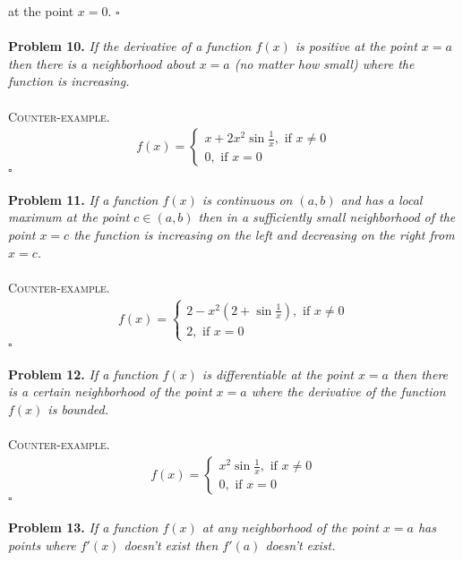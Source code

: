 \documentclass[a4paper]{article}
\numberwithin{equation}{section}
\begin{document}
at the point $x=0$. \hfill $\square$\\
\\
\textbf{Problem 10.} \textit{If the derivative of a function $ f(x)$ is positive at the point $x=a$ then there is a neighborhood about $x=a$ (no matter how small) where the function is increasing.}\\
\\
\textsc{Counter-example.} 
\begin{align}
f\left( x \right) = \left\{ {\begin{array}{*{20}{c}}
{x+2{x^2}\sin \frac{1}{x},\mbox{ if } x \ne 0}\\
{0,\mbox{ if } x = 0}
\end{array}} \right.
\end{align}
\hfill $\square$\\
\\
\textbf{Problem 11.} \textit{If a function $ f(x)$ is continuous on $(a,b)$ and has a local maximum at the point $c \in \left( {a,b} \right)$ then in a sufficiently small neighborhood of the point $x=c$ the function is increasing on the left and decreasing on the right from $x=c$.}\\
\\
\textsc{Counter-example.} 
\begin{align}
f\left( x \right) = \left\{ {\begin{array}{*{20}{c}}
{2 - {x^2}\left( {2 + \sin \frac{1}{x}} \right),\mbox{ if } x \ne 0}\\
{2,\mbox{ if } x = 0}
\end{array}} \right.
\end{align}
\hfill $\square$\\
\\
\textbf{Problem 12.} \textit{If a function $ f(x)$ is differentiable at the point $x=a$ then there is a certain neighborhood of the point $x=a$ where the derivative of the function $ f(x)$ is bounded.}\\
\\
\textsc{Counter-example.} 
\begin{align}
f\left( x \right) = \left\{ {\begin{array}{*{20}{c}}
{{x^2}\sin \frac{1}{x},\mbox{ if } x \ne 0}\\
{0,\mbox{ if } x = 0}
\end{array}} \right.
\end{align}
\hfill $\square$\\
\\
\textbf{Problem 13.} \textit{If a function $ f(x)$ at any neighborhood of the point $x=a$ has points where $f'(x)$ doesn't exist then $f'(a)$ doesn't exist.}\\
\end{document}
